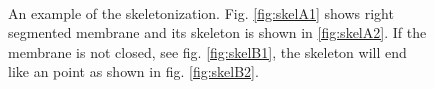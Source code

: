 \begin{figure}[htb]
	\centering
	\hskip 0.1cm
	\\
	\hskip 0.1cm
	\caption{An example of the skeletonization. Fig. \ref{fig:skelA1} shows right segmented membrane and its skeleton is shown in \ref{fig:skelA2}. If the membrane is not closed, see fig. \ref{fig:skelB1}, the skeleton will end like an point as shown in fig. \ref{fig:skelB2}.}
	\label{fig:skel}
\end{figure}

